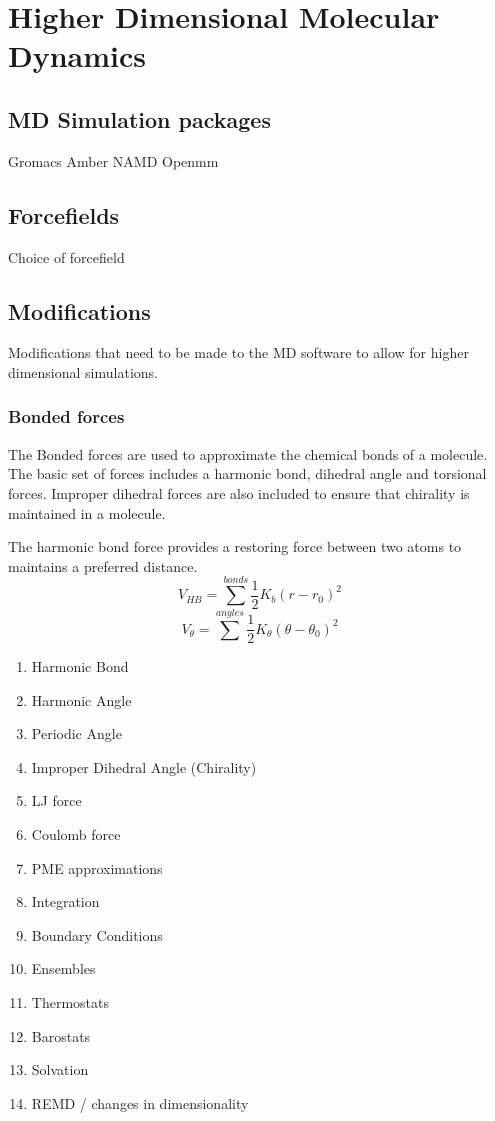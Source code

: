 \chapter{Higher Dimensional Molecular Dynamics}

\section{MD Simulation packages}

Gromacs
Amber
NAMD
Openmm

\section{Forcefields}
Choice of forcefield


\section{Modifications}

Modifications that need to be made to the MD software to allow for higher dimensional simulations.

\subsection{Bonded forces}
The Bonded forces are used to approximate the chemical bonds of a molecule. The basic set of forces includes a harmonic bond, dihedral angle and torsional forces. Improper dihedral forces are also included to ensure that chirality is maintained in a molecule. 

The harmonic bond force provides a restoring force between two atoms to maintains a preferred distance.
\begin{equation}\label{md:1:harmonic_bond}
V_{HB} = \sum^{bonds}\frac{1}{2} K_b (r - r_0)^2
\end{equation}
\begin{equation}\label{md:2:harmonic_angle}
V_{\theta} = \sum^{angles}\frac{1}{2} K_{\theta} (\theta - \theta_0)^2
\end{equation}


 
\begin{enumerate}
\item Harmonic Bond
\item Harmonic Angle
\item Periodic Angle
\item Improper Dihedral Angle (Chirality)
\item LJ force
\item Coulomb force
\item PME approximations
\item Integration
\item Boundary Conditions
\item Ensembles
\item Thermostats
\item Barostats
\item Solvation
\item REMD / changes in dimensionality
\end{enumerate}


\newpage